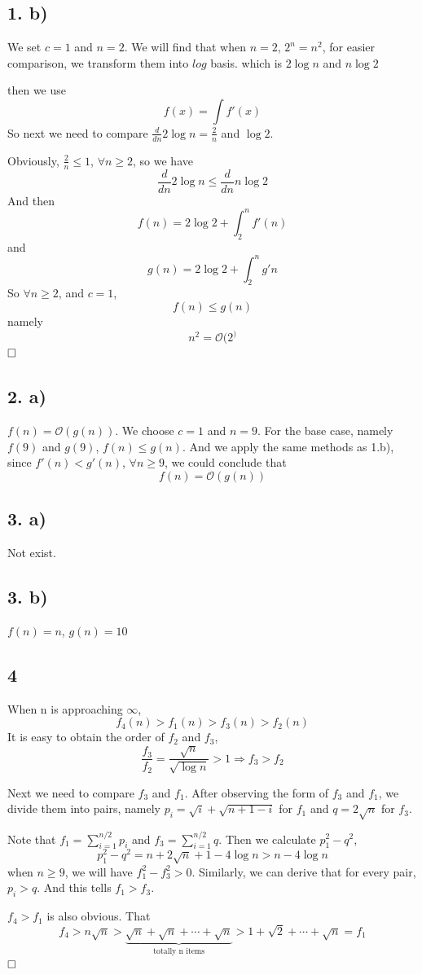 \documentclass[A4paper]{article}
\newcommand{\qedhere}{$\hfill\ensuremath{\square}$}
\begin{document}
\subsection*{1. b)}
We set $c = 1$ and $n = 2$. We will find that when $n=2$, $2^n = n^2$, for easier comparison, we transform them into $log$ basis. which is $2\log n$ and $n \log 2$
\par then we use 
\[
	f(x) = \int f'(x)
\]
So next we need to compare $\frac{d}{dn} 2 \log n = \frac{2}{n}$ and $\log 2$.\par  Obviously, $\frac{2}{n}\leq 1$, $\forall n \geq 2$, so we have \[
	\frac{d}{dn} 2 \log n \leq \frac{d}{dn} n \log 2
\]
And then 
\[
	f(n) = 2 \log 2 + \int_{2}^n f'(n)
\]
and \[
	g(n) = 2\log 2 + \int_2^n g'n
\]
So  $\forall 	n\geq 2$, and $c =1$, \[
	f(n) \leq g(n)
\]
namely
\[
	n^2 = \mathcal{O}(2^ )
\]
\qedhere
\subsection*{2. a)}
$f(n) = \mathcal{O}(g(n))$. We choose $c = 1$ and $n = 9$. For the base case, namely $f(9)$ and $g(9)$, $f(n) \leq g(n)$. And we apply the same methods as 1.b), since $f'(n)<g'(n)$, $\forall n \geq 9$, we could conclude that 
\[
f(n) = \mathcal{O}(g(n))
\] 
\subsection*{3. a)}
Not exist.
\subsection*{3. b)}
$f(n) = n$, $g(n) = 10$ 
\subsection*{4}
When n is approaching $\infty$,
\[
	f_4(n) > f_1(n) > f_3(n) > f_2(n)
\]
It is easy to obtain the order of $f_2$ and $f_3$, \[
	\frac{f_3}{f_2} = \frac{\sqrt{n}}{\sqrt{\log n}} >1 \Rightarrow  f_3 > f_2
\]
\par Next we need to compare $f_3$ and $f_1$. After observing the form of $f_3$ and $f_1$, we divide them into pairs, namely $p_i= \sqrt{i}+\sqrt{n+1-i}$ for $f_1$ and $q = 2 \sqrt{n}$ for $f_3$.
\par Note that $f_1 = \sum_{i=1}^{n/2} p_i$ and $f_3 = \sum_{i=1}^{n/2} q $.
Then we calculate $p_1^2-q^2$,
\[
	p_1^2-q^2 = n+ 2\sqrt{n}+1 - 4 \log n > n - 4\log n
\]
when $n\geq 9$, we will have $f_1^2-f_3^2>0$. Similarly, we can derive that for every pair, $p_i > q$. And this tells $f_1>f_3$.
\par $f_4>f_1$ is also obvious. That 
\[
	f_4 > n \sqrt{n} > \underbrace{\sqrt{n} + \sqrt{n} + \cdots + \sqrt{n}}_{\text{totally n items}} > 1 + \sqrt{2} + \cdots + \sqrt{n} = f_1
\]
\qedhere
\end{document}
